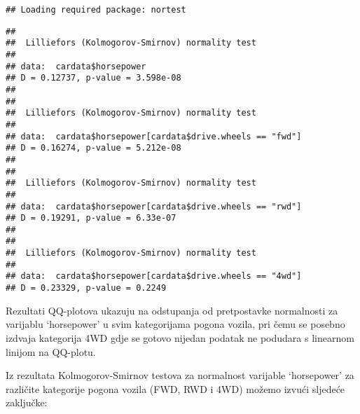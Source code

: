\documentclass[
]{article}
\newenvironment{Shaded}{\begin{snugshade}}{\end{snugshade}}
\newcommand{\CommentTok}[1]{\textcolor[rgb]{0.56,0.35,0.01}{\textit{#1}}}
\newcommand{\FunctionTok}[1]{\textcolor[rgb]{0.13,0.29,0.53}{\textbf{#1}}}
\newcommand{\NormalTok}[1]{#1}
\newcommand{\SpecialCharTok}[1]{\textcolor[rgb]{0.81,0.36,0.00}{\textbf{#1}}}
\newcommand{\StringTok}[1]{\textcolor[rgb]{0.31,0.60,0.02}{#1}}
\begin{document}
\begin{verbatim}
## Loading required package: nortest
\end{verbatim}

\begin{Shaded}
\end{Shaded}

\begin{verbatim}
## 
##  Lilliefors (Kolmogorov-Smirnov) normality test
## 
## data:  cardata$horsepower
## D = 0.12737, p-value = 3.598e-08
## 
## 
##  Lilliefors (Kolmogorov-Smirnov) normality test
## 
## data:  cardata$horsepower[cardata$drive.wheels == "fwd"]
## D = 0.16274, p-value = 5.212e-08
## 
## 
##  Lilliefors (Kolmogorov-Smirnov) normality test
## 
## data:  cardata$horsepower[cardata$drive.wheels == "rwd"]
## D = 0.19291, p-value = 6.33e-07
## 
## 
##  Lilliefors (Kolmogorov-Smirnov) normality test
## 
## data:  cardata$horsepower[cardata$drive.wheels == "4wd"]
## D = 0.23329, p-value = 0.2249
\end{verbatim}

Rezultati QQ-plotova ukazuju na odstupanja od pretpostavke normalnosti
za varijablu `horsepower' u svim kategorijama pogona vozila, pri čemu se
posebno izdvaja kategorija 4WD gdje se gotovo nijedan podatak ne
podudara s linearnom linijom na QQ-plotu.

Iz rezultata Kolmogorov-Smirnov testova za normalnost varijable
`horsepower' za različite kategorije pogona vozila (FWD, RWD i 4WD)
možemo izvući sljedeće zaključke:
\end{document}
